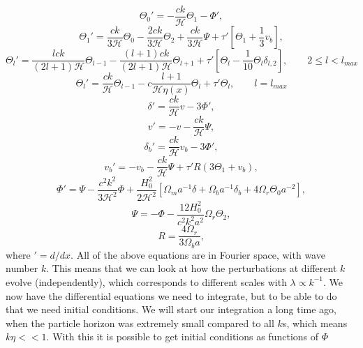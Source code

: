 \documentclass[a4paper,norsk, 10pt]{article}
\begin{document}
\begin{equation}
\Theta_0 ' = -\frac{ck}{\mathcal{H}}\Theta_1 - \Phi',
\end{equation}
\begin{equation}
\Theta_1' = \frac{ck}{3\mathcal{H}}\Theta_0 - \frac{2ck}{3\mathcal{H}}\Theta_2 + \frac{ck}{3\mathcal{H}}\Psi + \tau'\left[\Theta_1 + \frac{1}{3}v_b\right],
\end{equation}
\begin{equation}
\Theta_l' = \frac{lck}{(2l+1)\mathcal{H}}\Theta_{l-1} - \frac{(l+1)ck}{(2l+1)\mathcal{H}}\Theta_{l+1} + \tau'\left[\Theta_l - \frac{1}{10}\Theta_l \delta_{l,2}\right],\qquad 2 \leq l < l_{max}
\end{equation}
\begin{equation}
\Theta_l' = \frac{ck}{\mathcal{H}}\Theta_{l-1} - c\frac{l+1}{\mathcal{H}\eta(x)}\Theta_l + \tau'\Theta_l, \qquad l = l_{max}
\end{equation}
\begin{equation}
\delta' = \frac{ck}{\mathcal{H}}v - 3\Phi',
\end{equation}
\begin{equation}
v' = -v - \frac{ck}{\mathcal{H}}\Psi,
\end{equation}
\begin{equation}
\delta_b' = \frac{ck}{\mathcal{H}}v_b -3\Phi',
\end{equation}
\begin{equation}
v_b' = -v_b - \frac{ck}{\mathcal{H}}\Psi + \tau' R(3\Theta_1 + v_b),
\end{equation}
\begin{equation}
\Phi' = \Psi - \frac{c^2k^2}{3\mathcal{H}^2}\Phi + \frac{H_0^2}{2\mathcal{H}^2}\left[\Omega_ma^{-1}\delta + \Omega_b a^{-1}\delta_b + 4\Omega_r\Theta_0 a^{-2}\right],
\end{equation}
\begin{equation}
\Psi = -\Phi - \frac{12H_0^2}{c^2k^2a^2}\Omega_r\Theta_2,
\end{equation}
\begin{equation}
R = \frac{4\Omega_r}{3\Omega_b a},
\end{equation}
where $' = d/dx$. All of the above equations are in Fourier space, with wave number $k$. This means that we can look at how the perturbations at different $k$ evolve (independently), which corresponds to different scales with $\lambda \propto k^{-1}$. We now have the differential equations we need to integrate, but to be able to do that we need initial conditions. We will start our integration a long time ago, when the particle horizon was extremely small compared to all $k$s, which means $k\eta << 1$. With this it is possible to get initial conditions as functions of $\Phi$
\end{document}
